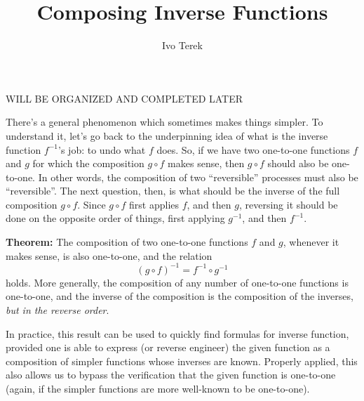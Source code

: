 \documentclass[nooutcomes]{ximera}
\author{Ivo Terek}
\title{Composing Inverse Functions}
\begin{document}
\licenseSZ
\begin{abstract}
  
\end{abstract}
\maketitle






WILL BE ORGANIZED AND COMPLETED LATER

There's a general phenomenon which sometimes makes things simpler. To understand it, let's go back to the underpinning idea of what is the inverse function $f^{-1}$'s job: to undo what $f$ does. So, if we have two one-to-one functions $f$ and $g$ for which the composition $g\circ f$ makes sense, then $g\circ f$ should also be one-to-one. In other words, the composition of two ``reversible'' processes must also be ``reversible''. The next question, then, is what should be the inverse of the full composition $g\circ f$. Since $g\circ f$ first applies $f$, and then $g$, reversing it should be done on the opposite order of things, first applying $g^{-1}$, and then $f^{-1}$.

\begin{callout}
  {\bf Theorem:} The composition of two one-to-one functions $f$ and $g$, whenever it makes sense, is also one-to-one, and the relation $$(g\circ f)^{-1} = f^{-1}\circ g^{-1}$$ holds. More generally, the composition of any number of one-to-one functions is one-to-one, and the inverse of the composition is the composition of the inverses, \emph{but in the reverse order}.
\end{callout}

In practice, this result can be used to quickly find formulas for inverse function, provided one is able to express (or reverse engineer) the given function as a composition of simpler functions whose inverses are known. Properly applied, this also allows us to bypass the verification that the given function is one-to-one (again, if the simpler functions are more well-known to be one-to-one). 
\end{document}
